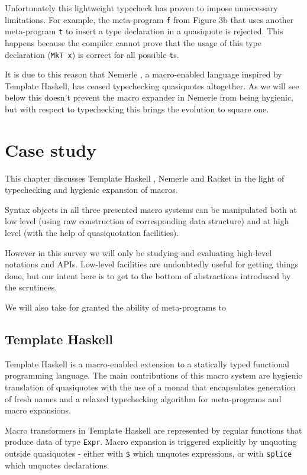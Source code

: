 \documentclass[10pt,journal,a4paper]{IEEEtran}
\begin{document}
Unfortunately this lightweight typecheck has proven to impose unnecessary limitations.
For example, the meta-program \small \texttt{f} \normalsize from Figure 3b
that uses another meta-program \small \texttt{t} \normalsize to insert a type declaration
in a quasiquote is rejected. This happens because the compiler cannot prove that
the usage of this type declaration (\small \texttt{MkT x}\normalsize)
is correct for all possible \small \texttt{t}\normalsize s.

It is due to this reason that Nemerle \cite{skalski05, skalski04},
a macro-enabled language inspired by Template Haskell,
has ceased typechecking quasiquotes altogether. As we will see below this doesn't prevent
the macro expander in Nemerle from being hygienic, but with respect to typechecking
this brings the evolution to square one.

\section{Case study}

This chapter discusses Template Haskell \cite{sheard02},
Nemerle \cite{skalski04,skalski05} and Racket \cite{barzilay11,flatt10}
in the light of typechecking and hygienic expansion of macros.

Syntax objects in all three presented macro systems can be manipulated
both at low level (using raw construction of corresponding data structure)
and at high level (with the help of quasiquotation facilities).

However in this survey we will only be studying and evaluating high-level notations and APIs.
Low-level facilities are undoubtedly useful for getting things done,
but our intent here is to get to the bottom of abstractions
introduced by the scrutinees.

We will also take for granted the ability of meta-programs to

\subsection{Template Haskell}

Template Haskell is a macro-enabled extension to a statically typed functional programming language.
The main contributions of this macro system are hygienic translation of quasiquotes with the use of
a monad that encapsulates generation of fresh names and a relaxed typechecking algorithm for
meta-programs and macro expansions.

Macro transformers in Template Haskell are represented by regular functions that produce
data of type \small \texttt{Expr}\normalsize. Macro expansion is triggered explicitly by
unquoting outside quasiquotes - either with \small \texttt{\$} \normalsize which unquotes expressions,
or with \small \texttt{splice} \normalsize which unquotes declarations.
\end{document}
